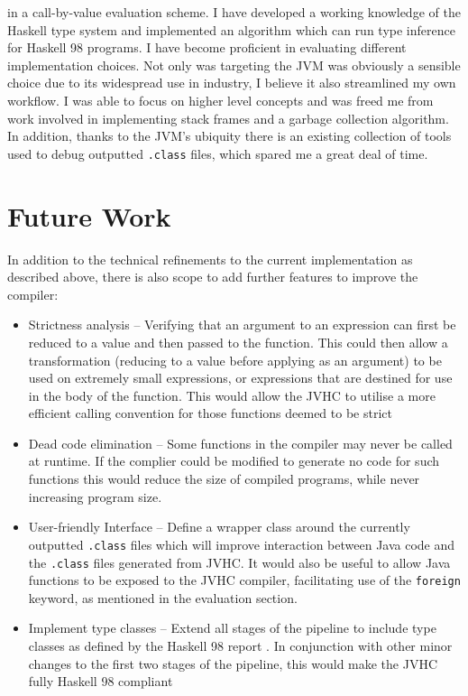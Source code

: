 \documentclass[float=false, crop=false]{standalone}
\begin{document}
in a call-by-value evaluation scheme. I have developed a working knowledge of the Haskell
type system and implemented an algorithm which can run type inference
for Haskell 98 programs. I have become proficient in evaluating different implementation
choices. Not only was targeting the JVM was obviously a sensible choice due to its widespread use in industry, I believe it also streamlined my own workflow. I was able to focus on higher level concepts and was freed me from work involved in 
implementing stack frames and a garbage collection algorithm. 
In addition, thanks to the JVM’s ubiquity there is an existing collection of tools 
used to debug outputted \verb|.class| files, which spared me a great deal of time. 



\section{Future Work}

In addition to the technical refinements to the current implementation as described above, there is also scope to add further features to improve the compiler:


\begin{itemize}
  \item Strictness analysis -- Verifying that an argument to an
    expression can first be reduced to a value and then passed
    to the function. This could then allow a transformation 
    (reducing to a value before applying as an argument) to be used 
    on extremely small expressions, or expressions that are destined for use in the body of the function. This would allow the JVHC to utilise a more efficient calling convention for those functions deemed to be strict

  \item Dead code elimination -- Some functions in the compiler may never
    be called at runtime. 
    If the complier could be modified to generate no code for such functions this would
    reduce the size of compiled programs, while never
    increasing program size.

  \item User-friendly Interface -- Define a wrapper class
    around the currently outputted \verb|.class| files
    which will improve interaction between Java code and the
    \verb|.class| files generated from JVHC. It would also
    be useful to allow Java functions to be exposed to the JVHC 
    compiler, facilitating use of the \verb|foreign| keyword, 
    as mentioned in the evaluation section.

  \item Implement type classes -- Extend all stages of the pipeline to 
    include type classes as defined by the Haskell 98 report 
    \cite{haskell98-spec}. In conjunction with other minor changes to the first two stages of the pipeline,
    this would make the JVHC fully Haskell 98 compliant

\end{itemize}
\end{document}
